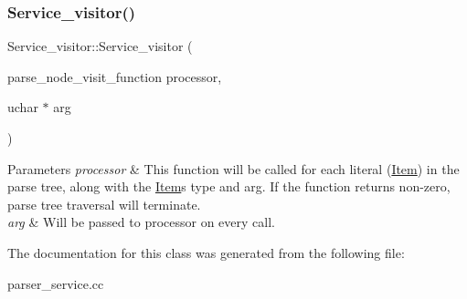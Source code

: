 \subsubsection{\texorpdfstring{Service\+\_\+visitor()}{Service\_visitor()}}
{\footnotesize\ttfamily Service\+\_\+visitor\+::\+Service\+\_\+visitor (\begin{DoxyParamCaption}\item[{parse\+\_\+node\+\_\+visit\+\_\+function}]{processor,  }\item[{uchar $\ast$}]{arg }\end{DoxyParamCaption})\hspace{0.3cm}{\ttfamily [inline]}}


\begin{DoxyParams}{Parameters}
{\em processor} & This function will be called for each literal (\mbox{\hyperlink{classItem}{Item}}) in the parse tree, along with the \mbox{\hyperlink{classItem}{Item}}\textquotesingle{}s type and arg. If the function returns non-\/zero, parse tree traversal will terminate.\\
\hline
{\em arg} & Will be passed to processor on every call. \\
\hline
\end{DoxyParams}


The documentation for this class was generated from the following file\+:\begin{DoxyCompactItemize}
\item 
parser\+\_\+service.\+cc\end{DoxyCompactItemize}

